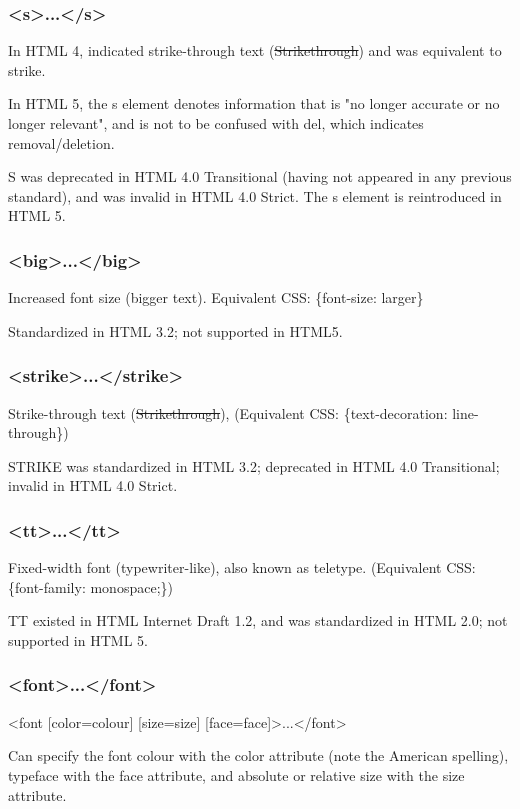 \subsubsection{<s>...</s>}

In HTML 4, indicated strike-through text (\sout{Strikethrough}) and was equivalent to strike.

In HTML 5, the s element denotes information that is "no longer accurate or no longer relevant", and is not to be confused with del, which indicates removal/deletion.

S was deprecated in HTML 4.0 Transitional (having not appeared in any previous standard), and was invalid in HTML 4.0 Strict. The s element is reintroduced in HTML 5.

\subsubsection{<big>...</big>}

Increased font size (bigger text). Equivalent CSS: \{font-size: larger\}

Standardized in HTML 3.2; not supported in HTML5.


\subsubsection{<strike>...</strike>}


Strike-through text (\sout{Strikethrough}), (Equivalent CSS: \{text-decoration: line-through\})

STRIKE was standardized in HTML 3.2; deprecated in HTML 4.0 Transitional; invalid in HTML 4.0 Strict.


\subsubsection{<tt>...</tt>}

Fixed-width font (typewriter-like), also known as teletype. (Equivalent CSS: \{font-family: monospace;\})


TT existed in HTML Internet Draft 1.2, and was standardized in HTML 2.0; not supported in HTML 5.


\subsubsection{<font>...</font>}


<font [color=colour] [size=size] [face=face]>...</font>

Can specify the font colour with the color attribute (note the American spelling), typeface with the face attribute, and absolute or relative size with the size attribute.

